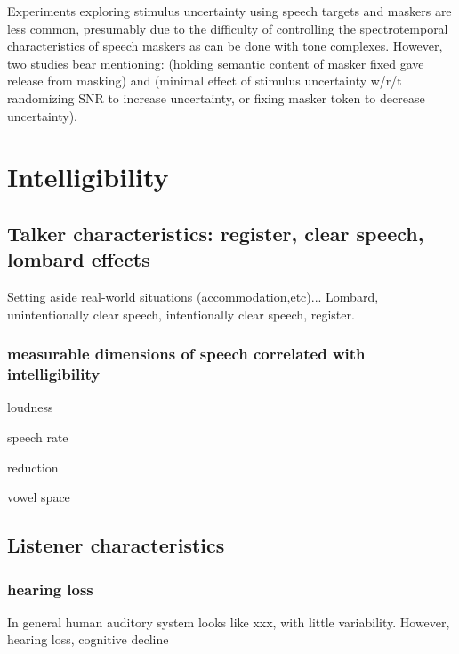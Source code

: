 Experiments exploring stimulus uncertainty using speech targets and maskers are less common, presumably due to the difficulty of controlling the spectrotemporal characteristics of speech maskers as can be done with tone complexes.  However, two studies bear mentioning: \citet{BrungartSimpson2004} (holding semantic content of masker fixed gave release from masking) and \citet{FreymanEtAl2007} (minimal effect of stimulus uncertainty w/r/t randomizing SNR to increase uncertainty, or fixing masker token to decrease uncertainty).  


\section{Intelligibility}

\subsection{Talker characteristics: register, clear speech, lombard effects}
Setting aside real-world situations (accommodation,etc)...  Lombard, unintentionally clear speech, intentionally clear speech, register.

\subsubsection{measurable dimensions of speech correlated with intelligibility}
\begin{itm}
	\item{loudness}
	\item{speech rate}
	\item{reduction}
	\item{vowel space}
\end{itm}

\subsection{Listener characteristics}
\subsubsection{hearing loss}
In general human auditory system looks like xxx, with little variability.  However, hearing loss, cognitive decline

